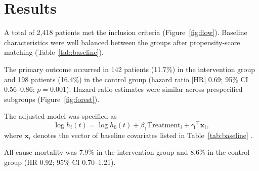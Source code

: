 \section{Results}
\label{sec:results}

A total of 2,418 patients met the inclusion criteria (Figure~\ref{fig:flow}). Baseline characteristics were well balanced between the groups after propensity-score matching \cite{austin2011introduction} (Table~\ref{tab:baseline}).

The primary outcome occurred in 142 patients (11.7\%) in the intervention group and 198 patients (16.4\%) in the control group (hazard ratio [HR] 0.69; 95\% CI 0.56--0.86; $p = 0.001$). Hazard ratio estimates were similar across prespecified subgroups (Figure~\ref{fig:forest}).

The adjusted model was specified as
\begin{equation}
  \log h_i(t) = \log h_0(t) + \beta_1 \text{Treatment}_i + \boldsymbol{\gamma}^\top \mathbf{x}_i ,
  \label{eq:cox}
\end{equation}
where $\mathbf{x}_i$ denotes the vector of baseline covariates listed in Table~\ref{tab:baseline} \cite{cox1972regression, therneau2000modeling}.

All-cause mortality was 7.9\% in the intervention group and 8.6\% in the control group (HR 0.92; 95\% CI 0.70--1.21).
